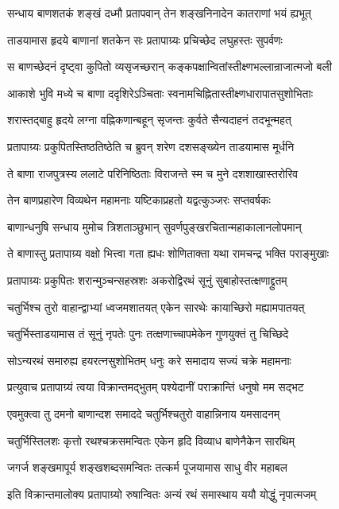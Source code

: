 \twolineshloka
{सन्धाय बाणशतकं शङ्खं दध्मौ प्रतापवान्}
{तेन शङ्खनिनादेन कातराणां भयं ह्यभूत्}%

\twolineshloka
{ताडयामास हृदये बाणानां शतकेन सः}
{प्रतापाग्र्यः प्रचिच्छेद लघुहस्तः सुपर्वणः}%

\twolineshloka
{स बाणच्छेदनं दृष्ट्वा कुपितो व्यसृजच्छरान्}
{कङ्कपक्षान्वितांस्तीक्ष्णभल्लान्राजात्मजो बली}%

\twolineshloka
{आकाशे भुवि मध्ये च बाणा ददृशिरेऽञ्चिताः}
{स्वनामचिह्नितास्तीक्ष्णधारापातसुशोभिताः}%

\twolineshloka
{शरास्तद्बाहु हृदये लग्ना वह्निकणान्बहून्}
{सृजन्तः कुर्वते सैन्यदाहनं तदभून्महत्}%

\twolineshloka
{प्रतापाग्र्यः प्रकुपितस्तिष्ठतिष्ठेति च ब्रुवन्}
{शरेण दशसङ्ख्येन ताडयामास मूर्धनि}%

\twolineshloka
{ते बाणा राजपुत्रस्य ललाटे परिनिष्ठिताः}
{विराजन्ते स्म च मुने दशशाखास्तरोरिव}%

\twolineshloka
{तेन बाणप्रहारेण विव्यथेन महामनाः}
{यष्टिकाप्रहतो यद्वत्कुञ्जरः सप्तवर्षकः}%

\twolineshloka
{बाणान्धनुषि सन्धाय मुमोच त्रिशताञ्छुभान्}
{सुवर्णपुङ्खरचितान्महाकालानलोपमान्}%

\twolineshloka
{ते बाणास्तु प्रतापाग्र्य वक्षो भित्त्वा गता ह्यधः}
{शोणिताक्ता यथा रामचन्द्र भक्ति पराङ्मुखाः}%

\twolineshloka
{प्रतापाग्र्यः प्रकुपितः शरान्मुञ्चन्सहस्रशः}
{अकरोद्विरथं सूनुं सुबाहोस्तत्क्षणाद्द्रुतम्}%

\twolineshloka
{चतुर्भिश्च तुरो वाहान्द्वाभ्यां ध्वजमशातयत्}
{एकेन सारथेः कायाच्छिरो मह्यामपातयत्}%

\twolineshloka
{चतुर्भिस्ताडयामास तं सूनुं नृपतेः पुनः}
{तत्क्षणाच्चापमेकेन गुणयुक्तं तु चिच्छिदे}%

\twolineshloka
{सोऽन्यरथं समारुह्य हयरत्नसुशोभितम्}
{धनुः करे समादाय सज्यं चक्रे महामनाः}%

\twolineshloka
{प्रत्युवाच प्रतापाग्र्यं त्वया विक्रान्तमद्भुतम्}
{पश्येदानीं पराक्रान्तिं धनुषो मम सद्भट}%

\twolineshloka
{एवमुक्त्वा तु दमनो बाणान्दश समाददे}
{चतुर्भिश्चतुरो वाहान्निनाय यमसादनम्}%

\twolineshloka
{चतुर्भिस्तिलशः कृत्तो रथश्चक्रसमन्वितः}
{एकेन हृदि विव्याध बाणेनैकेन सारथिम्}%

\twolineshloka
{जगर्ज शङ्खमापूर्य शङ्खशब्दसमन्वितः}
{तत्कर्म पूजयामास साधु वीर महाबल}%

\twolineshloka
{इति विक्रान्तमालोक्य प्रतापाग्र्यो रुषान्वितः}
{अन्यं रथं समास्थाय ययौ योद्धुं नृपात्मजम्}%

